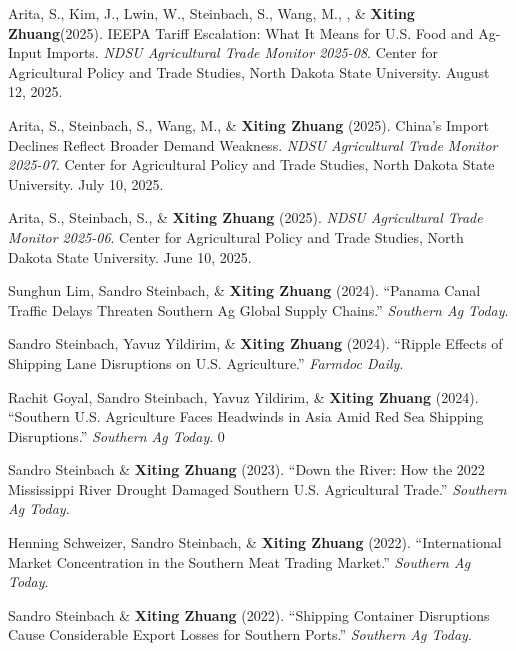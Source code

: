 \documentclass[10.5pt,letterpaper]{article}
\renewenvironment{itemize}{
	\begin{list}{}{
			\setlength{\leftmargin}{1.5em}
		}
	}{
	\end{list}
}
\begin{document}
\begin{itemize}
		\item[-] Arita, S., Kim, J., Lwin, W., Steinbach, S., Wang, M., , \& \textbf{Xiting Zhuang}(2025).  
		IEEPA Tariff Escalation: What It Means for U.S. Food and Ag-Input Imports.  
		\textit{NDSU Agricultural Trade Monitor 2025-08}. Center for Agricultural Policy and Trade Studies, North Dakota State University. August 12, 2025.  



	\item[-] Arita, S., Steinbach, S., Wang, M., \& \textbf{Xiting Zhuang} (2025).  
China’s Import Declines Reflect Broader Demand Weakness.  
\textit{NDSU Agricultural Trade Monitor 2025-07}. Center for Agricultural Policy and Trade Studies, North Dakota State University. July 10, 2025.

\item[-] Arita, S., Steinbach, S., \& \textbf{Xiting Zhuang} (2025).  
\textit{NDSU Agricultural Trade Monitor 2025-06}. Center for Agricultural Policy and Trade Studies, North Dakota State University. June 10, 2025.


		
	
		\item[-] Sunghun Lim, Sandro Steinbach, \& \textbf{Xiting Zhuang} (2024).  
		``Panama Canal Traffic Delays Threaten Southern Ag Global Supply Chains.''  
		\textit{Southern Ag Today}.
		
		\item[-] Sandro Steinbach, Yavuz Yildirim, \& \textbf{Xiting Zhuang} (2024).  
		``Ripple Effects of Shipping Lane Disruptions on U.S. Agriculture.''  
		\textit{Farmdoc Daily}.
		
		\item[-] Rachit Goyal, Sandro Steinbach, Yavuz Yildirim, \& \textbf{Xiting Zhuang} (2024).  
		``Southern U.S. Agriculture Faces Headwinds in Asia Amid Red Sea Shipping Disruptions.''  
		\textit{Southern Ag Today}.
		0
		\item[-] Sandro Steinbach \& \textbf{Xiting Zhuang} (2023).  
		``Down the River: How the 2022 Mississippi River Drought Damaged Southern U.S. Agricultural Trade.''  
		\textit{Southern Ag Today}.
		
		\item[-] Henning Schweizer, Sandro Steinbach, \& \textbf{Xiting Zhuang} (2022).  
		``International Market Concentration in the Southern Meat Trading Market.''  
		\textit{Southern Ag Today}.
		
		\item[-] Sandro Steinbach \& \textbf{Xiting Zhuang} (2022).  
		``Shipping Container Disruptions Cause Considerable Export Losses for Southern Ports.''  
		\textit{Southern Ag Today}.
		

\end{itemize}
\end{document}
